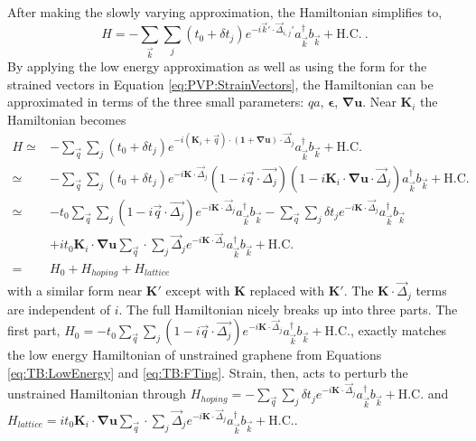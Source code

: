 After making the slowly varying approximation, the Hamiltonian simplifies to,
\begin{equation*}
    H=-\sum_{\vec{k}} \sum_{j} \left( t_0+\delta t_j \right)
    e^{-i\vec{k}'\cdot \vec{\Delta}_{i,j}'}
    a_{\vec{k}}^{\dagger} b_{\vec{k}} +\text{H.C.} \ .
\end{equation*}
By applying the low energy approximation as well as using the form for the strained vectors in Equation \ref{eq:PVP:StrainVectors}, the Hamiltonian can be approximated in terms of the three small parameters: $qa$, $\bm{\epsilon}$, $\bm{\nabla u}$.
Near $\bm{K}_i$ the Hamiltonian becomes 
\begin{align*}
  H\simeq& -\sum_{\vec{q}} \sum_{j} \left( t_0+\delta t_j \right)
    e^{-i (\bm{K}_i+\vec{q}) \cdot (\bm{1}+\bm{\nabla u}) \cdot \vec{\Delta}_{j}}
    a_{\vec{k}}^{\dagger} b_{\vec{k}} +\text{H.C.} \\
   \simeq& -\sum_{\vec{q}} \sum_{j} \left( t_0+\delta t_j \right) e^{-i \bm{K} \cdot \vec{\Delta}_j}
    (1-i \vec{q} \cdot \vec{\Delta_j}) (1-i\bm{K}_i\cdot \bm{\nabla u} \cdot \vec{\Delta}_j)
    a_{\vec{k}}^{\dagger} b_{\vec{k}} +\text{H.C.} \\
   \simeq& 
    -t_0 \sum_{\vec{q}} \sum_{j} (1-i\vec{q} \cdot \vec{\Delta_j}) e^{-i \bm{K} \cdot \vec{\Delta}_j} a_{\vec{k}}^{\dagger}b_{\vec{k}}
    -\sum_{\vec{q}} \sum_{j} \delta t_j e^{-i \bm{K} \cdot \vec{\Delta}_j} a_{\vec{k}}^{\dagger}b_{\vec{k}} \\
    &+i t_0 \bm{K}_i \cdot \bm{\nabla u} \sum_{\vec{q}} \cdot \sum_{j} \vec{\Delta}_j e^{-i \bm{K} \cdot \vec{\Delta}_j} a_{\vec{k}}^{\dagger}b_{\vec{k}}
    +\text{H.C.} \\
   =& H_0+H_{hoping}+H_{lattice}
\end{align*}
with a similar form near $\bm{K'}$ except with $\bm{K}$ replaced with $\bm{K'}$.
The $\bm{K} \cdot \vec{\Delta}_j$ terms are independent of $i$. 
The full Hamiltonian nicely breaks up into three parts.
The first part, $H_0=-t_0 \sum_{\vec{q}} \sum_{j} (1-i\vec{q} \cdot \vec{\Delta_j}) e^{-i \bm{K} \cdot \vec{\Delta}_j} a_{\vec{k}}^{\dagger}b_{\vec{k}}+\text{H.C.}$, exactly matches the low energy Hamiltonian of unstrained graphene from Equations \ref{eq:TB:LowEnergy} and \ref{eq:TB:FTing}.
Strain, then, acts to perturb the unstrained Hamiltonian through $H_{hoping}=-\sum_{\vec{q}} \sum_{j} \delta t_j e^{-i \bm{K} \cdot \vec{\Delta}_j} a_{\vec{k}}^{\dagger}b_{\vec{k}}+\text{H.C.}$ and $H_{lattice}=i t_0 \bm{K}_i \cdot \bm{\nabla u} \sum_{\vec{q}} \cdot \sum_{j} \vec{\Delta}_j e^{-i \bm{K} \cdot \vec{\Delta}_j} a_{\vec{k}}^{\dagger}b_{\vec{k}}+\text{H.C.}$.
